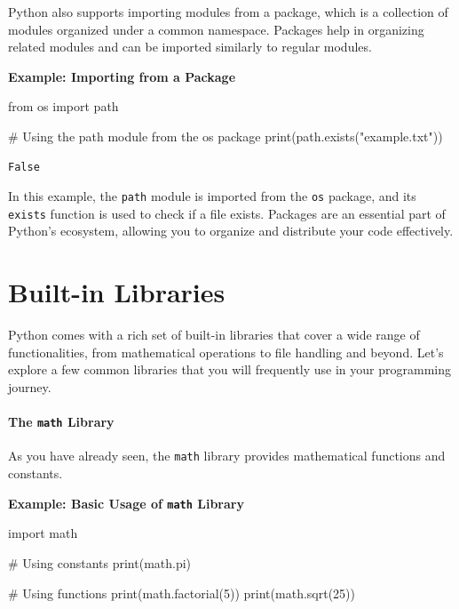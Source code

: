 \documentclass[
  letterpaper,
  DIV=11,
  numbers=noendperiod]{scrreprt}
\let\oldparagraph\paragraph
\renewcommand{\paragraph}[1]{\oldparagraph{#1}\mbox{}}
\newenvironment{Shaded}{\begin{snugshade}}{\end{snugshade}}
\newcommand{\BuiltInTok}[1]{\textcolor[rgb]{0.00,0.23,0.31}{#1}}
\newcommand{\CommentTok}[1]{\textcolor[rgb]{0.37,0.37,0.37}{#1}}
\newcommand{\DecValTok}[1]{\textcolor[rgb]{0.68,0.00,0.00}{#1}}
\newcommand{\ImportTok}[1]{\textcolor[rgb]{0.00,0.46,0.62}{#1}}
\newcommand{\NormalTok}[1]{\textcolor[rgb]{0.00,0.23,0.31}{#1}}
\newcommand{\StringTok}[1]{\textcolor[rgb]{0.13,0.47,0.30}{#1}}
\begin{document}
Python also supports importing modules from a package, which is a
collection of modules organized under a common namespace. Packages help
in organizing related modules and can be imported similarly to regular
modules.

\textbf{Example: Importing from a Package}

\begin{Shaded}
\begin{Highlighting}[]
\ImportTok{from}\NormalTok{ os }\ImportTok{import}\NormalTok{ path}

\CommentTok{\# Using the path module from the os package}
\BuiltInTok{print}\NormalTok{(path.exists(}\StringTok{"example.txt"}\NormalTok{)) }
\end{Highlighting}
\end{Shaded}

\begin{verbatim}
False
\end{verbatim}

In this example, the \texttt{path} module is imported from the
\texttt{os} package, and its \texttt{exists} function is used to check
if a file exists. Packages are an essential part of Python's ecosystem,
allowing you to organize and distribute your code effectively.

\hypertarget{built-in-libraries}{%
\section{Built-in Libraries}\label{built-in-libraries}}

Python comes with a rich set of built-in libraries that cover a wide
range of functionalities, from mathematical operations to file handling
and beyond. Let's explore a few common libraries that you will
frequently use in your programming journey.

\hypertarget{the-math-library}{%
\paragraph{\texorpdfstring{The \texttt{math}
Library}{The math Library}}\label{the-math-library}}

As you have already seen, the \texttt{math} library provides
mathematical functions and constants.

\textbf{Example: Basic Usage of \texttt{math} Library}

\begin{Shaded}
\begin{Highlighting}[]
\ImportTok{import}\NormalTok{ math}

\CommentTok{\# Using constants}
\BuiltInTok{print}\NormalTok{(math.pi)}

\CommentTok{\# Using functions}
\BuiltInTok{print}\NormalTok{(math.factorial(}\DecValTok{5}\NormalTok{))}
\BuiltInTok{print}\NormalTok{(math.sqrt(}\DecValTok{25}\NormalTok{))}
\end{Highlighting}
\end{Shaded}
\end{document}
